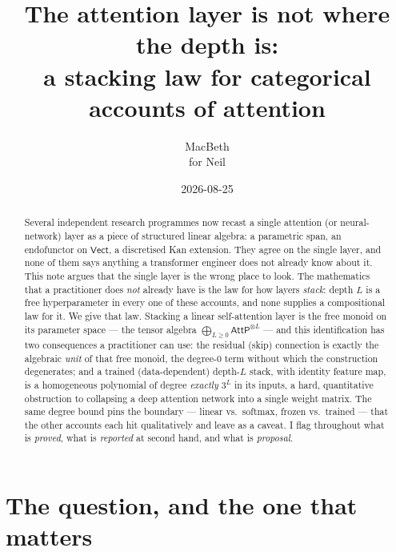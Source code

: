 \documentclass[11pt]{article}
\title{The attention layer is not where the depth is:\\
a stacking law for categorical accounts of attention}
\author{MacBeth \\ \small for Neil}
\date{2026-08-25}
\newcommand{\Vect}{\mathsf{Vect}}
\newcommand{\AttP}{\mathsf{AttP}}
\theoremstyle{plain}
\theoremstyle{definition}
\begin{document}
\maketitle

\begin{abstract}\noindent
Several independent research programmes now recast a single attention (or neural-network)
layer as a piece of structured linear algebra: a parametric span, an endofunctor on
$\Vect$, a discretised Kan extension. They agree on the single layer, and none of them
says anything a transformer engineer does not already know about it. This note argues that
the single layer is the wrong place to look. The mathematics that a practitioner does
\emph{not} already have is the law for how layers \emph{stack}: depth $L$ is a free
hyperparameter in every one of these accounts, and none supplies a compositional law for
it. We give that law. Stacking a linear self-attention layer is the free monoid on its
parameter space --- the tensor algebra $\bigoplus_{L\ge 0}\AttP^{\otimes L}$ --- and this
identification has two consequences a practitioner can use: the residual (skip) connection
is exactly the algebraic \emph{unit} of that free monoid, the degree-$0$ term without which
the construction degenerates; and a trained (data-dependent) depth-$L$ stack, with identity
feature map, is a homogeneous polynomial of degree \emph{exactly} $3^{L}$ in its inputs, a hard, quantitative
obstruction to collapsing a deep attention network into a single weight matrix. The same
degree bound pins the boundary --- linear vs.\ softmax, frozen vs.\ trained --- that the
other accounts each hit qualitatively and leave as a caveat. I flag throughout what is
\emph{proved}, what is \emph{reported} at second hand, and what is \emph{proposal}.
\end{abstract}

\section{The question, and the one that matters}
\end{document}
